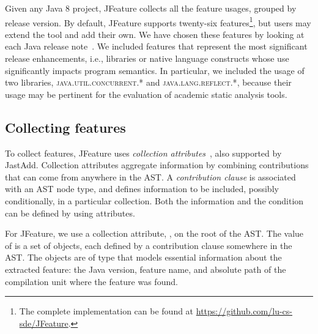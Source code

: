 Given any Java 8 project, JFeature collects all the feature usages, grouped by release version. By default, JFeature supports twenty-six features\footnote{The complete implementation can be found at \url{https://github.com/lu-cs-sde/JFeature}.}, but users may extend the tool and add their own. We have chosen these features by looking at each Java release note~\cite{java1,java2,java3,java4,java5,java6,java7,java8}. We included features that represent the most significant release enhancements, i.e., libraries or native language constructs whose use significantly impacts program semantics. In particular, we included the usage of two libraries, \textsc{java.util.concurrent.*} and \textsc{java.lang.reflect.*}, because their usage may be pertinent for the evaluation of academic static analysis tools.


\subsection{Collecting features}
To collect features, JFeature uses \emph{collection attributes}~\cite{boyland1996descriptional,collectionattributes}, also supported by JastAdd.
Collection attributes aggregate information by combining contributions that can come from anywhere in the AST.
A \emph{contribution clause} is associated with an AST node type, and defines information to be included, possibly conditionally, in a particular collection.
Both the information and the condition can be defined by using attributes.

For JFeature, we use a collection attribute, , on the root of the AST.
The value of  is a set of objects, each defined by a contribution clause somewhere in the AST.
The objects are of type  that
models essential information about the extracted feature: the Java version, feature name, and absolute path of the compilation unit where the feature was found.


